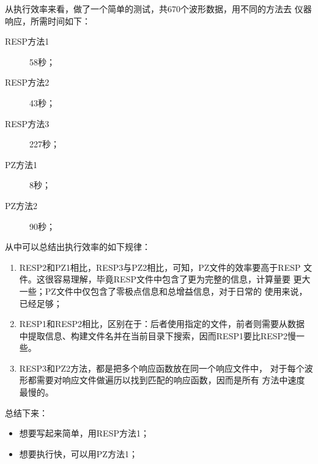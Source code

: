 从执行效率来看，做了一个简单的测试，共670个波形数据，用不同的方法去
仪器响应，所需时间如下：
\begin{description}
\item [RESP方法1] 58秒；
\item [RESP方法2] 43秒；
\item [RESP方法3] 227秒；
\item [PZ方法1] 8秒；
\item [PZ方法2] 90秒；
\end{description}
从中可以总结出执行效率的如下规律：
\begin{enumerate}
\item RESP2和PZ1相比，RESP3与PZ2相比，可知，PZ文件的效率要高于RESP
    文件。这很容易理解，毕竟RESP文件中包含了更为完整的信息，计算量要
    更大一些；PZ文件中仅包含了零极点信息和总增益信息，对于日常的
    使用来说，已经足够；
\item RESP1和RESP2相比，区别在于：后者使用指定的文件，前者则需要从数据
    中提取信息、构建文件名并在当前目录下搜索，因而RESP1要比RESP2慢一些。
\item RESP3和PZ2方法，都是把多个响应函数放在同一个响应文件中，
    对于每个波形都需要对响应文件做遍历以找到匹配的响应函数，因而是所有
    方法中速度最慢的。
\end{enumerate}

总结下来：
\begin{itemize}
\item 想要写起来简单，用RESP方法1；
\item 想要执行快，可以用PZ方法1；
\end{itemize}
